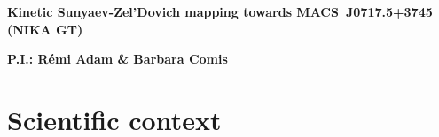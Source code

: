\documentclass[11pt,a4paper,twoside,graphicx,color]{article}
\begin{document}
%
%
\begin{center}{\huge \bf
Kinetic Sunyaev-Zel'Dovich mapping towards MACS~J0717.5+3745 (NIKA GT)
}\end{center}
%
\centerline{\bf P.I.: R\'emi Adam \& Barbara Comis}


\section{Scientific context}
\end{document}
